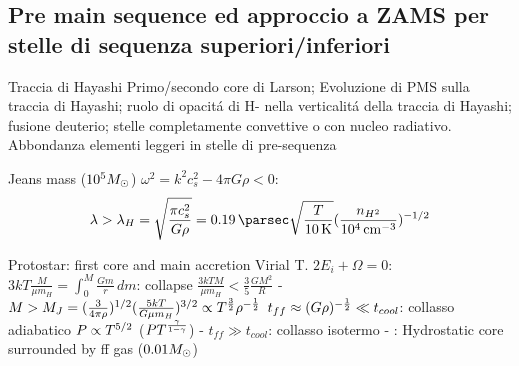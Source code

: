 \subsection{Pre main sequence ed approccio a ZAMS per stelle di sequenza superiori/inferiori}

\begin{frame}{Traccia di Hayashi}
Primo/secondo core di Larson; Evoluzione di PMS sulla traccia di Hayashi; ruolo di opacit\'a di H- nella verticalit\'a della traccia di Hayashi; fusione deuterio; stelle completamente convettive o con nucleo radiativo. Abbondanza elementi leggeri in stelle di pre-sequenza
\end{frame}


\begin{frame}{Jeans mass ($\num{e5}M_{\odot}$)}
 $\omega^2=k^2c_s^2-4\pi G\rho<0$:
\[\lambda>\lambda_H=\sqrt{\frac{\pi c_s^2}{G\rho}}=\SI{0.19}{\parsec}\sqrt{\frac{T}{\SI{10}{\kelvin}}}(\frac{n_{H^2}}{\SI{e4}{\per\cubic\cm}})\expy{-1/2}\]
\end{frame}

\begin{frame}{Protostar: first core and main accretion}
Virial T. $2E_i+\Omega=0$: $3kT\frac{M}{\mu m_H}=\int_0^M\frac{Gm}{r}\,dm$: collapse $\frac{3kTM}{\mu m_H}<\frac{3}{5}\frac{GM^2}{R}$ - $M>M_J=(\frac{3}{4\pi\rho})^{1/2}(\frac{5kT}{G\mu m_H})^{3/2}\propto T^{\frac{3}{2}}\rho^{-\frac{1}{2}}$
$t_{ff}\approx(G\rho)^{-\frac{1}{2}}\ll t_{cool}$: collasso adiabatico $P\propto T^{5/2}$ ($PT^{\frac{\gamma}{1-\gamma}}$) - $t_{ff}\gg t_{cool}$: collasso isotermo - : Hydrostatic core surrounded by ff gas ($0.01M_{\odot}$) 
\end{frame}
